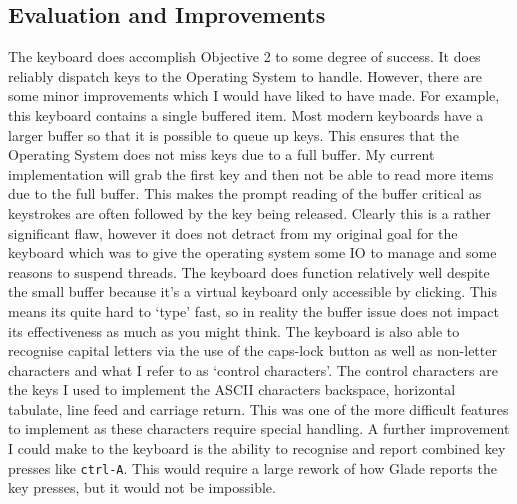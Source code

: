 \subsection{Evaluation and Improvements}
The keyboard does accomplish Objective 2 to some degree of success. It does reliably dispatch keys to the Operating System to handle. However, there are some minor improvements which I would have liked to have made. For example, this keyboard contains a single buffered item. Most modern keyboards have a larger buffer so that it is possible to queue up keys. This ensures that the Operating System does not miss keys due to a full buffer. My current implementation will grab the first key and then not be able to read more items due to the full buffer. This makes the prompt reading of the buffer critical as keystrokes are often followed by the key being released. Clearly this is a rather significant flaw, however it does not detract from my original goal for the keyboard which was to give the operating system some IO to manage and some reasons to suspend threads. The keyboard does function relatively well despite the small buffer because it's a virtual keyboard only accessible by clicking. This means its quite hard to `type' fast, so in reality the buffer issue does not impact its effectiveness as much as you might think. The keyboard is also able to recognise capital letters via the use of the caps-lock button as well as non-letter characters and what I refer to as `control characters'. The control characters are the keys I used to implement the ASCII characters backspace, horizontal tabulate, line feed and carriage return. This was one of the more difficult features to implement as these characters require special handling.
A further improvement I could make to the keyboard is the ability to recognise and report combined key presses like \verb|ctrl-A|. This would require a large rework of how Glade reports the key presses, but it would not be impossible. 